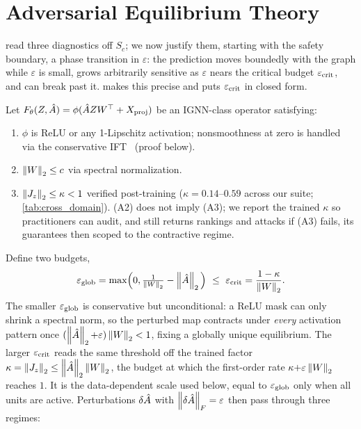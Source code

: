 \section{Adversarial Equilibrium Theory}
\label{sec:theory}

 read three diagnostics off $S_c$; we now justify them, starting with the safety boundary, a phase transition in $\varepsilon$: the prediction moves boundedly with the graph while $\varepsilon$ is small, grows arbitrarily sensitive as $\varepsilon$ nears the critical budget $\varepsilon_{\mathrm{crit}}$, and can break past it.  makes this precise and puts $\varepsilon_{\mathrm{crit}}$ in closed form.

\begin{theorem}
\label{thm:phase_transition}
Let $F_\theta(Z, \hat{A}) = \phi(\hat{A} ZW^\top + X_{\mathrm{proj}})$ be an IGNN-class operator satisfying:
\begin{enumerate}
\item[(A1)] $\phi$ is ReLU or any 1-Lipschitz activation; nonsmoothness at zero is handled via the conservative IFT~\cite{bolte2021conservative} (proof below).
\item[(A2)] $\left\|W\right\|_2 \leq c$ via spectral normalization.
\item[(A3)] $\left\|J_z\right\|_2 \leq \kappa < 1$ verified post-training ($\kappa{=}0.14$--$0.59$ across our suite; \cref{tab:cross_domain}). (A2) does not imply (A3); we report the trained $\kappa$ so practitioners can audit, and \AEGIS still returns rankings and attacks if (A3) fails, its guarantees then scoped to the contractive regime.
\end{enumerate}
Define two budgets,
\begin{equation}
\eglob=\max\!\Big(0,\tfrac{1}{\norm{W}_2}-\norm{\Ahat}_2\Big)\ \le\ \ecrit=\frac{1-\kappa}{\norm{W}_2}.
\label{eq:budgets}
\end{equation}
The smaller $\varepsilon_{\mathrm{glob}}$ is conservative but unconditional: a ReLU mask can only shrink a spectral norm, so the perturbed map contracts under \emph{every} activation pattern once $(\left\|\hat{A}\right\|_2{+}\varepsilon)\left\|W\right\|_2<1$, fixing a globally unique equilibrium. The larger $\varepsilon_{\mathrm{crit}}$ reads the same threshold off the trained factor $\kappa=\left\|J_z\right\|_2\le\left\|\hat{A}\right\|_2\left\|W\right\|_2$, the budget at which the first-order rate $\kappa{+}\varepsilon\left\|W\right\|_2$ reaches $1$. It is the data-dependent scale used below, equal to $\varepsilon_{\mathrm{glob}}$ only when all units are active. Perturbations $\delta\hat{A}$ with $\left\|\delta\hat{A}\right\|_F=\varepsilon$ then pass through three regimes:


\end{theorem}
